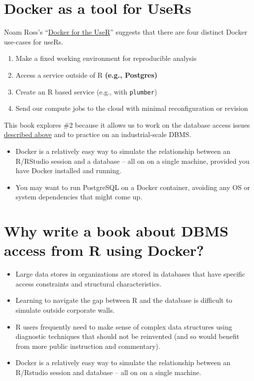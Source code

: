 \documentclass[]{book}
\providecommand{\tightlist}{%
  \setlength{\itemsep}{0pt}\setlength{\parskip}{0pt}}
\theoremstyle{definition}
\theoremstyle{definition}
\theoremstyle{definition}
\theoremstyle{remark}
\begin{document}
\hypertarget{docker-as-a-tool-for-users}{%
\section{Docker as a tool for UseRs}\label{docker-as-a-tool-for-users}}

Noam Ross's
``\href{https://nyhackr.blob.core.windows.net/presentations/Docker-for-the-UseR_Noam-Ross.pdf}{Docker
for the UseR}'' suggests that there are four distinct Docker use-cases
for useRs.

\begin{enumerate}
\def\labelenumi{\arabic{enumi}.}
\tightlist
\item
  Make a fixed working environment for reproducible analysis
\item
  Access a service outside of R \textbf{(e.g., Postgres)}
\item
  Create an R based service (e.g., with \texttt{plumber})
\item
  Send our compute jobs to the cloud with minimal reconfiguration or
  revision
\end{enumerate}

This book explores \#2 because it allows us to work on the database
access issues
\protect\hyperlink{using-r-to-query-a-dbms-in-your-organization}{described
above} and to practice on an industrial-scale DBMS.

\begin{itemize}
\tightlist
\item
  Docker is a relatively easy way to simulate the relationship between
  an R/RStudio session and a database -- all on on a single machine,
  provided you have Docker installed and running.
\item
  You may want to run PostgreSQL on a Docker container, avoiding any OS
  or system dependencies that might come up.
\end{itemize}

\hypertarget{why-write-a-book-about-dbms-access-from-r-using-docker}{%
\section{Why write a book about DBMS access from R using
Docker?}\label{why-write-a-book-about-dbms-access-from-r-using-docker}}

\begin{itemize}
\tightlist
\item
  Large data stores in organizations are stored in databases that have
  specific access constraints and structural characteristics.
\item
  Learning to navigate the gap between R and the database is difficult
  to simulate outside corporate walls.
\item
  R users frequently need to make sense of complex data structures using
  diagnostic techniques that should not be reinvented (and so would
  benefit from more public instruction and commentary).
\item
  Docker is a relatively easy way to simulate the relationship between
  an R/Rstudio session and database -- all on on a single machine.
\end{itemize}
\end{document}
